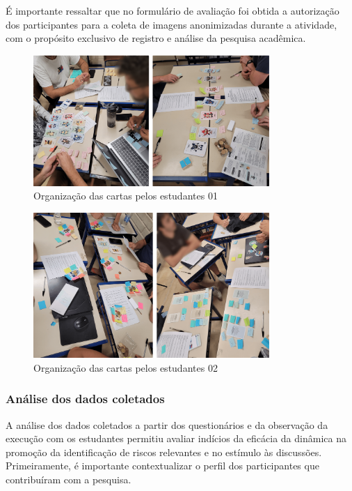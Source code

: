 \documentclass[
	12pt,
	openright,
	twoside,
	a4paper,
	english,
	brazil
	]{abntex2}
\begin{document}
É importante ressaltar que no formulário de avaliação foi obtida a autorização dos participantes para a coleta de imagens anonimizadas durante a atividade, com o propósito exclusivo de registro e análise da pesquisa acadêmica.

\begin{figure}[H]
  \centering
	\caption{\label{aplicacao-aula-mesa-1} Organização das cartas pelos estudantes 01}
  \includegraphics[width=0.8\textwidth]{aplicacao-aula-mesa-1}
\end{figure}

\begin{figure}[H]
  \centering
	\caption{\label{aplicacao-aula-mesa-2} Organização das cartas pelos estudantes 02}
  \includegraphics[width=0.8\textwidth]{aplicacao-aula-mesa-2}
\end{figure}

\subsubsection{Análise dos dados coletados}

A análise dos dados coletados a partir dos questionários e da observação da execução com os estudantes permitiu avaliar indícios da eficácia da dinâmica na promoção da identificação de riscos relevantes e no estímulo às discussões. Primeiramente, é importante contextualizar o perfil dos participantes que contribuíram com a pesquisa.
\end{document}
